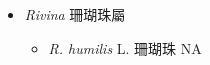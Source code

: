 
  \begin{itemize}
 \item[] \textit{Rivina} 珊瑚珠屬
                                
  \begin{itemize}
        \item[] \textit{R. humilis} L.  珊瑚珠   NA
  \end{itemize}
  \end{itemize}

